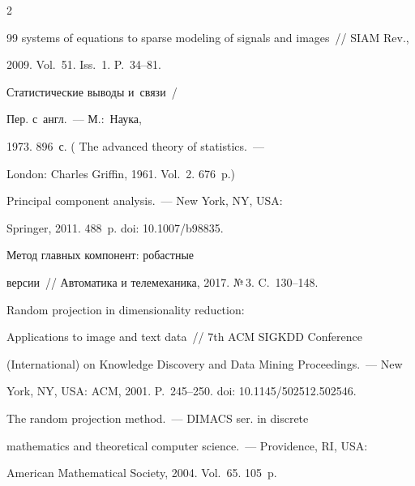 \begin{multicols}{2}
{{\begin{thebibliography}{99}
systems of equations to sparse modeling of signals and images~// SIAM Rev., 


2009. Vol.~51. Iss.~1. P.~34--81.







 Статистические выводы и~связи~/


Пер. с~англ.~--- М.:~Наука, 


1973. 896~с. ( {The advanced theory of statistics.}~--- 


London: Charles Griffin, 1961.  Vol.~2. 676~p.)







 Principal component analysis.~--- New York, NY, USA: 


Springer, 2011. 488~p. doi: 10.1007/b98835.







 Метод главных компонент: робастные 


версии~// Автоматика и телемеханика, 2017. №\,3. C.~130--148.







 Random projection in dimensionality reduction: 


Applications to image and text data~// 7th ACM SIGKDD Conference 


(International) on Knowledge Discovery and Data Mining Proceedings.~--- New 


York, NY, USA: ACM, 2001. P.~245--250. doi: 10.1145/502512.502546.







 The random projection method.~--- \mbox{DIMACS} ser. in discrete 


mathematics and theoretical computer science.~--- Providence, RI, USA: 


American Mathematical Society, 2004. Vol.~65. 105~p.






\end{thebibliography}}}
\end{multicols}

